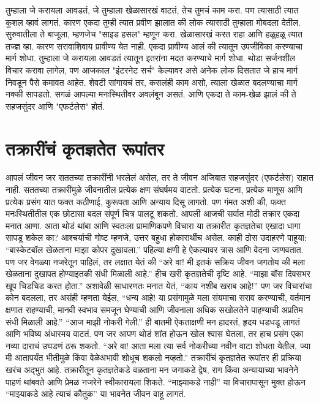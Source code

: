 तुम्हाला जे करायला आवडतं, जे तुम्हाला खेळासारखं वाटतं, तेच तुमचं काम करा. पण त्यासाठी त्यात कुशल व्हावं लागतं. कारण एकदा तुम्ही त्यात प्रवीण झालात की लोक त्यासाठी तुम्हाला मोबदला देतील. सुरुवातीला ते बाजूला, म्हणजेच "साइड हसल" म्हणून करा. खेळासारखं करत राहा आणि हळूहळू त्यात तज्ज्ञ व्हा. कारण सरावाशिवाय प्रावीण्य येत नाही.
एकदा प्रावीण्य आलं की त्यातून उपजीविका करण्याचा मार्ग शोधा. तुम्हाला जे करायला आवडतं त्यातून इतरांना मदत करण्याचे मार्ग शोधा. थोडा सर्जनशील विचार करावा लागेल, पण आजकाल "इंटरनेट सर्च" केल्यावर असे अनेक लोक दिसतात जे हाच मार्ग निवडून पैसे कमावत आहेत.
शेवटी सांगायचं तर, कसलंही काम असो, त्याला खेळात बदलण्याचा मार्ग नक्की सापडतो. सगळं आपल्या मनःस्थितीवर अवलंबून असतं. आणि एकदा ते काम-खेळ झालं की ते सहजसुंदर आणि "एफर्टलेस" होतं.
 \chapter{तक्रारींचं कृतज्ञतेत रूपांतर}
आपलं जीवन जर सततच्या तक्रारींनी भरलेलं असेल, तर ते जीवन अजिबात सहजसुंदर (एफर्टलेस) राहात नाही. सततच्या तक्रारींमुळे जीवनातील प्रत्येक क्षण संघर्षमय वाटतो. प्रत्येक घटना, प्रत्येक माणूस आणि प्रत्येक प्रसंग यात फक्त कठीणाई, कुरूपता आणि अन्याय दिसू लागतो. पण गंमत अशी की, फक्त मनःस्थितीतील एक छोटासा बदल संपूर्ण चित्र पालटू शकतो.
आपली आजची सर्वात मोठी तक्रार एकदा मनात आणा. आता थोडं थांबा आणि स्वतःला प्रामाणिकपणे विचारा या तक्रारीत कृतज्ञतेचा एखादा धागा सापडू शकेल का? आश्चर्याची गोष्ट म्हणजे, उत्तर बहुधा होकारार्थीच असेल. काही ठोस उदाहरणे पाहूया:
“बास्केटबॉल खेळताना माझा कोपर दुखावला.” पहिल्या क्षणी हे ऐकल्यावर त्रास आणि वेदना जाणवतात. पण जर वेगळ्या नजरेतून पाहिलं, तर लक्षात येतं की  “अरे वा! मी इतकं सक्रिय जीवन जगतोय की मला खेळताना दुखापत होण्याइतकी संधी मिळाली आहे.” हीच खरी कृतज्ञतेची दृष्टि आहे.
“माझा बॉस दिवसभर खूप चिडचिड करत होता.” अशावेळी साधारणतः मनात येतं, “काय नशीब खराब आहे!” पण जर विचारांचा कोन बदलला, तर असंही म्हणता येईल,  “धन्य आहे! या प्रसंगामुळे मला संयमाचा सराव करण्याची, वर्तमान क्षणात राहण्याची, मानवी स्वभाव समजून घेण्याची आणि जीवनाला अधिक सखोलतेने पाहण्याची अप्रतिम संधी मिळाली आहे.”
“आज माझी नोकरी गेली.” ही बातमी ऐकताक्षणी मन हादरतं, हृदय धडधडू लागतं आणि भविष्य अंधारमय वाटतं. पण जर आपण थोडं शांत होऊन खोल श्वास घेतला, तर हाच प्रसंग एका नव्या दाराचं उघडणं ठरू शकतो. “अरे वा! आता मला त्या सर्व नोकरीच्या नवीन वाटा शोधता येतील, ज्या मी आतापर्यंत भीतीमुळे किंवा वेळेअभावी शोधूच शकलो नव्हतो.”
तक्रारींचं कृतज्ञतेत रूपांतर ही प्रक्रिया खरंच अद्भुत आहे. तक्रारीतून कृतज्ञतेकडे वळताना मन जगाकडे द्वेष, राग किंवा अन्यायाच्या भावनेने पाहणं थांबवते आणि प्रेमळ नजरेने स्वीकारायला शिकते. “माझ्याकडे नाही” या विचारापासून मुक्त होऊन “माझ्याकडे आहे त्याचं कौतुक” या भावनेत जीवन वाहू लागतं.
